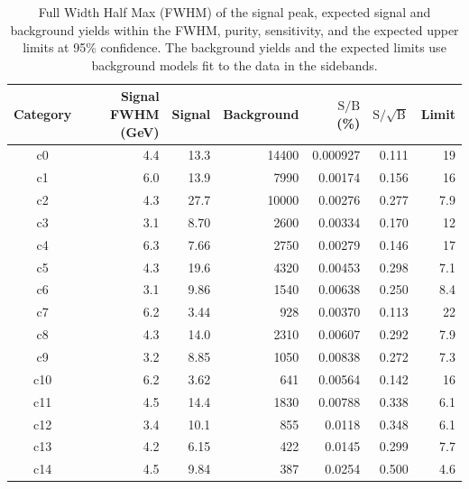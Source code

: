 \begin{table}[htb]
  \caption{Full Width Half Max (FWHM) of the signal peak, expected signal and background yields within the FWHM,
           purity, sensitivity, and the expected upper limits at 95\% confidence. 
           The background yields and the expected limits use background models fit to the data in the sidebands.}
  \label{tab:cat_resoln}
  \begin{center}
    \begin{tabular}{crrrrrr}
      \hline
      Category  & Signal FWHM (GeV) & Signal & Background & $\mathrm{S / B}$ (\%) & $\mathrm{S / \sqrt{B}}$ & Limit \\  %
      \hline
        c0         &         4.4     &        13.3     &        14400    &        0.000927    &     0.111    &  19    \\
        c1         &         6.0     &        13.9     &        7990     &        0.00174     &     0.156    &  16    \\
        c2         &         4.3     &        27.7     &        10000    &        0.00276     &     0.277    &  7.9   \\
        c3         &         3.1     &        8.70     &        2600     &        0.00334     &     0.170    &  12    \\
        c4         &         6.3     &        7.66     &        2750     &        0.00279     &     0.146    &  17    \\
        c5         &         4.3     &        19.6     &        4320     &        0.00453     &     0.298    &  7.1   \\
        c6         &         3.1     &        9.86     &        1540     &        0.00638     &     0.250    &  8.4   \\
        c7         &         6.2     &        3.44     &        928      &        0.00370     &     0.113    &  22    \\
        c8         &         4.3     &        14.0     &        2310     &        0.00607     &     0.292    &  7.9   \\
        c9         &         3.2     &        8.85     &        1050     &        0.00838     &     0.272    &  7.3   \\
        c10        &         6.2     &        3.62     &        641      &        0.00564     &     0.142    &  16    \\
        c11        &         4.5     &        14.4     &        1830     &        0.00788     &     0.338    &  6.1   \\
        c12        &         3.4     &        10.1     &        855      &        0.0118      &     0.348    &  6.1   \\
        c13        &         4.2     &        6.15     &        422      &        0.0145      &     0.299    &  7.7   \\
        c14        &         4.5     &        9.84     &        387      &        0.0254      &     0.500    &  4.6   \\
      \hline
    \end{tabular}
  \end{center}
\end{table}

